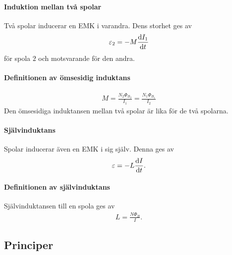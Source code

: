 \deriv

\paragraph{Induktion mellan två spolar}
Två spolar inducerar en EMK i varandra. Dens storhet ges av
\begin{align*}
	\varepsilon_2 = -M\dv{I_1}{t}
\end{align*}
för spola $2$ och motsvarande för den andra.

\deriv

\paragraph{Definitionen av ömsesidig induktans}
\begin{align*}
	M = \frac{N_2\Phi_{B_2}}{I_1} = \frac{N_1\Phi_{B_1}}{I_2}
\end{align*}
Den ömsesidiga induktansen mellan två spolar är lika för de två spolarna.

\paragraph{Självinduktans}
Spolar inducerar även en EMK i sig själv. Denna ges av
\begin{align*}
	\varepsilon = -L\dv{I}{t}.
\end{align*}

\deriv

\paragraph{Definitionen av självinduktans}
Självinduktansen till en spola ges av
\begin{align*}
	L = \frac{N\Phi_{B}}{I}.
\end{align*}

\deriv

\subsection{Principer}

